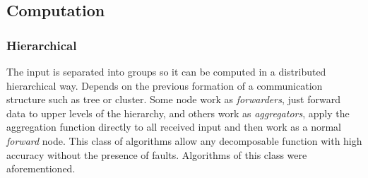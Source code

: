 \subsection{Computation}
\subsubsection{Hierarchical}
The input is separated into groups so it can be computed in a distributed hierarchical way.  Depends on the previous formation of a communication structure such as tree or cluster. Some node work as \textit{forwarders}, just forward data to upper levels of the hierarchy, and others work as \textit{aggregators}, apply the aggregation function directly to all received input and then work as a normal \textit{forward} node. This class of algorithms allow any decomposable function with high accuracy without the presence of faults. Algorithms of this class were aforementioned.
